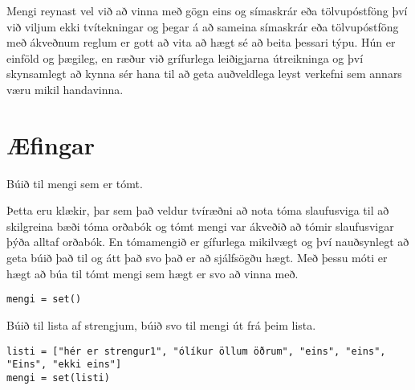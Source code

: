Mengi reynast vel við að vinna með gögn eins og símaskrár eða tölvupóstföng því við viljum ekki tvítekningar og þegar á að sameina símaskrár eða tölvupóstföng með ákveðnum reglum er gott að vita að hægt sé að beita þessari týpu.
Hún er einföld og þægileg, en ræður við grífurlega leiðigjarna útreikninga og því skynsamlegt að kynna sér hana til að geta auðveldlega leyst verkefni sem annars væru mikil handavinna.


\newpage
\section{Æfingar}
\begin{exercise}\label{set1}
Búið til mengi sem er tómt.
\end{exercise}
\begin{Answer}[ref={set1}]
Þetta eru klækir, þar sem það veldur tvíræðni að nota tóma slaufusviga til að skilgreina bæði tóma orðabók og tómt mengi var ákveðið að tómir slaufusvigar þýða alltaf orðabók.
En tómamengið er gífurlega mikilvægt og því nauðsynlegt að geta búið það til og átt það svo það er að sjálfsögðu hægt.
Með þessu móti er hægt að búa til tómt mengi sem hægt er svo að vinna með.
	\begin{lstlisting}
mengi = set()
	\end{lstlisting}
\end{Answer}


\begin{exercise}\label{set2}
Búið til lista af strengjum, búið svo til mengi út frá þeim lista.
\end{exercise}
\begin{Answer}[ref={set2}]
	
	\begin{lstlisting}
listi = ["hér er strengur1", "ólíkur öllum öðrum", "eins", "eins", "Eins", "ekki eins"]
mengi = set(listi)\end{lstlisting}
\end{Answer}


